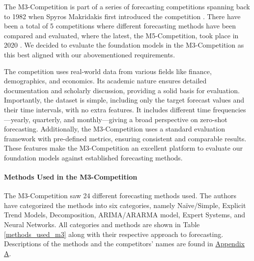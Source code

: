 \documentclass[12pt,a4paper]{article}
\begin{document}
The M3-Competition is part of a series of forecasting competitions spanning back to 1982 when Spyros Makridakis first introduced the competition \parencite{IIF}. There have been a total of 5 competitions where different forecasting methods have been compared and evaluated, where the latest, the M5-Competition, took place in 2020 \parencite{Makridakis2019}. We decided to evaluate the foundation models in the M3-Competition as this best aligned with our abovementioned requirements.

The competition uses real-world data from various fields like finance, demographics, and economics. Its academic nature ensures detailed documentation and scholarly discussion, providing a solid basis for evaluation. Importantly, the dataset is simple, including only the target forecast values and their time intervals, with no extra features. It includes different time frequencies—yearly, quarterly, and monthly—giving a broad perspective on zero-shot forecasting. Additionally, the M3-Competition uses a standard evaluation framework with pre-defined metrics, ensuring consistent and comparable results. These features make the M3-Competition an excellent platform to evaluate our foundation models against established forecasting methods.

\paragraph{Methods Used in the M3-Competition}

The M3-Competition saw 24 different forecasting methods used. The authors have categorized the methods into six categories, namely Naïve/Simple, Explicit Trend Models, Decomposition, ARIMA/ARARMA model, Expert Systems, and Neural Networks. All categories and methods are shown in Table \ref{methods_used_m3} along with their respective approach to forecasting. Descriptions of the methods and the competitors' names are found in \hyperref[appendix_a]{Appendix A}.
\end{document}
